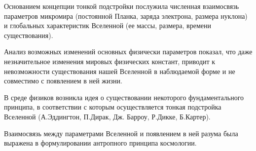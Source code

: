 \documentclass[exam_answers.tex]{subfiles}
\begin{document}
Основанием концепции тонкой подстройки послужила численная
взаимосвязь параметров микромира (постоянной Планка, заряда электрона,
размера нуклона) и глобальных характеристик Вселенной (ее массы,
размера, времени существования).

Анализ возможных изменений основных физически параметров показал, что
даже незначительное изменения мировых физических констант, приводит к
невозможности существования нашей Вселенной в наблюдаемой форме и не
совместимо с появлением в ней жизни.

В среде физиков возникла идея о существовании некоторого
фундаментального принципа, в соответствии с которым осуществляется
тонкая подстройка Вселенной (А.Эддингтон, П.Дирак, Дж. Барроу, Р.Дикке,
Б.Картер).

Взаимосвязь между параметрами Вселенной и появлением в ней разума
была выражена в формулировании антропного принципа космологии.
\end{document}

